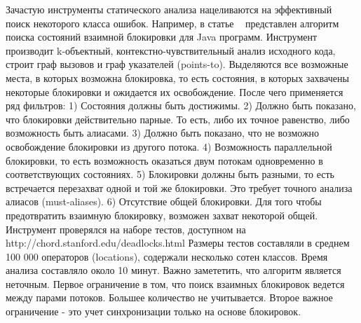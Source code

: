 Зачастую инструменты статического анализа нацеливаются на эффективный поиск некоторого класса ошибок. Например, в статье ~\cite{Naik:2009} представлен алгоритм поиска состояний взаимной блокировки для Java программ. Инструмент производит k-объектный, контекстно-чувствительный анализ исходного кода, строит граф вызовов и граф указателей (points-to). Выделяются все возможные места, в которых возможна блокировка, то есть состояния, в которых захвачены некоторые блокировки и ожидается их освобождение. После чего применяется ряд фильтров:
1) Состояния должны быть достижимы.
2) Должно быть показано, что блокировки действительно парные. То есть, либо их точное равенство, либо возможность быть алиасами.
3) Должно быть показано, что не возможно освобождение блокировки из другого потока. 
4) Возможность параллельной блокировки, то есть возможность оказаться двум потокам одновременно в соответствующих состояниях.
5) Блокировки должны быть разными, то есть встречается перезахват одной и той же блокировки. Это требует точного анализа алиасов (must-aliases).
6) Отсутствие общей блокировки. Для того чтобы предотвратить взаимную блокировку, возможен захват некоторой общей.
Инструмент проверялся на наборе тестов, доступном на http://chord.stanford.edu/deadlocks.html Размеры тестов составляли в среднем 100 000 операторов (locations), содержали несколько сотен классов. Время анализа составляло около 10 минут. Важно замететить, что алгоритм является неточным. Первое ограничение в том, что поиск взаимных блокировок ведется между парами потоков. Большее количество не учитывается. Второе важное ограничение - это учет синхронизации только на основе блокировок.


